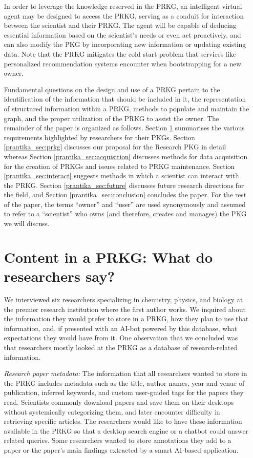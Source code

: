 \documentclass[11pt,pdftex]{article}
\begin{document}
In order to leverage the knowledge reserved in the PRKG, an intelligent virtual agent may be designed to access the PRKG, serving as a conduit for interaction between the scientist and their PRKG. The agent will be capable of deducing essential information based on the scientist's needs or even act proactively, and can also modify the PKG by incorporating new information or updating existing data. Note that the PRKG mitigates the cold start problem that services like personalized recommendation systems encounter when bootstrapping for a new owner.

Fundamental questions on the design and use of a PRKG pertain to the identification of the information that should be included in it, the representation of structured information within a PRKG, methods to populate and maintain the graph, and the proper utilization of the PRKG to assist the owner.
The remainder of the paper is organized as follows. Section \ref{prantika_sec:requirements} summarises the various requirements highlighted by researchers for their PKGs. Section \ref{prantika_sec:prkg} discusses our proposal for the Research PKG in detail whereas Section \ref{prantika_sec:acquisition} discusses methods for data acquisition for the creation of PRKGs and issues related to PRKG maintenance. Section \ref{prantika_sec:interact} suggests methods in which a scientist can interact with the PRKG. Section \ref{prantika_sec:future} discusses future research directions for the field, and Section \ref{prantika_sec:conclusion} concludes the paper. For the rest of the paper, the terms ``owner'' and ``user'' are used synonymously and assumed to refer to a ``scientist'' who owns (and therefore, creates and manages) the PKG we will discuss.


\section{Content in a PRKG: What do researchers say?} 
\label{prantika_sec:requirements}
We interviewed six researchers specializing in chemistry, physics, and biology at the premier research institution where the first author works. We inquired about the information they would prefer to store in a PRKG, how they plan to use that information, and, if presented with an AI-bot powered by this database, what expectations they would have from it. One observation that we concluded was that researchers mostly looked at the PRKG as a database of research-related information.

\textit{Research paper metadata: }The information that all researchers wanted to store in the PRKG includes metadata such as the title, author names, year and venue of publication, inferred keywords, and custom user-guided tags for the papers they read. Scientists commonly download papers and save them on their desktops without systemically categorizing them, and later encounter difficulty in retrieving specific articles. The researchers would like to have these information available in the PRKG so that a desktop search engine or a chatbot could answer related queries. Some researchers wanted to store annotations they add to a paper or the paper's main findings extracted by a smart AI-based application. 
\end{document}

